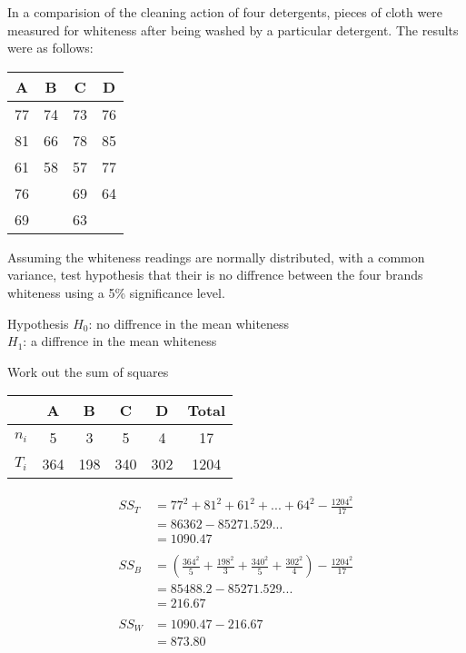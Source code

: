         \begin{example}
        {   
            In a comparision of the cleaning action of four detergents, pieces of cloth were measured for whiteness after being washed by a particular detergent. The results were as follows:
            \begin{center}
            \begin{tabular}{c|c|c|c}
            A  & B  & C  & D  \\
            \hline
            77 & 74 & 73 & 76 \\
            81 & 66 & 78 & 85 \\
            61 & 58 & 57 & 77 \\
            76 &    & 69 & 64 \\
            69 &    & 63 &    \\
            \end{tabular}
            \end{center}
            Assuming the whiteness readings are normally distributed, with a common variance, test hypothesis that their is no diffrence between the four brands whiteness using a 5\% significance level.
        }

        \begin{step}{Hypothesis}
        $H_0$: no diffrence in the mean whiteness\\
        $H_1$: a diffrence in the mean whiteness\\
        \end{step}

        \begin{step}{Work out the sum of squares}
        \begin{center}
        \begin{tabular}{l|c|c|c|c|c}
                & A     & B     & C     & D     & Total \\
        \hline
        $n_i$   & 5     & 3     & 5     & 4     & 17    \\
        $T_i$   & 364   & 198   & 340   & 302   & 1204  \\
        \end{tabular}
        \end{center}

        \begin{align*}
        SS_T &= 77^2 + 81^2 + 61^2 + ... + 64^2 - \frac{1204^2}{17}\\
        &= 86362 - 85271.529...\\
        &= 1090.47\\
        \\
        SS_B &= (\frac{364^2}{5} + \frac{198^2}{3} + \frac{340^2}{5} + \frac{302^2}{4}) - \frac{1204^2}{17}\\
        &= 85488.2 - 85271.529...\\
        &= 216.67\\
        \\
        SS_W &= 1090.47 - 216.67\\
        &= 873.80
        \end{align*}
        \end{step}


\end{example}
